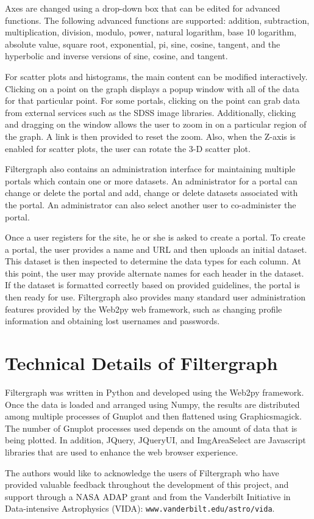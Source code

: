 Axes are changed using a drop-down box that can be edited for advanced functions. The following advanced functions are supported: addition, subtraction, multiplication, division, modulo, power, natural logarithm, base 10 logarithm, absolute value, square root, exponential, pi, sine, cosine, tangent, and the hyperbolic and inverse versions of sine, cosine, and tangent.

For scatter plots and histograms, the main content can be modified interactively. Clicking on a point on the graph displays a popup window with all of the data for that particular point. For some portals, clicking on the point can grab data from external services such as the SDSS image libraries. Additionally, clicking and dragging on the window allows the user to zoom in on a particular region of the graph. A link is then provided to reset the zoom. Also, when the Z-axis is enabled for scatter plots, the user can rotate the 3-D scatter plot.

Filtergraph also contains an administration interface for maintaining multiple portals which contain one or more datasets. An administrator for a portal can change or delete the portal and add, change or delete datasets associated with the portal. An administrator can also select another user to co-administer the portal.

Once a user registers for the site, he or she is asked to create a portal. To create a portal, the user provides a name and URL and then uploads an initial dataset. This dataset is then inspected to determine the data types for each column. At this point, the user may provide alternate names for each header in the dataset. If the dataset is formatted correctly based on provided guidelines, the portal is then ready for use. Filtergraph also provides many standard user administration features provided by the Web2py web framework, such as changing profile information and obtaining lost usernames and passwords.



\section{Technical Details of Filtergraph}
Filtergraph was written in Python and developed using the Web2py framework. Once the data is loaded and arranged using Numpy, the results are distributed among multiple processes of Gnuplot and then flattened using Graphicsmagick. The number of Gnuplot processes used depends on the amount of data that is being plotted. In addition, JQuery, JQueryUI, and ImgAreaSelect are Javascript libraries that are used to enhance the web browser experience. 

\acknowledgements 
The authors would like to acknowledge the users of Filtergraph who have provided valuable feedback throughout the development of this project, and support  through a NASA ADAP grant and from the Vanderbilt Initiative in Data-intensive Astrophysics (VIDA): {\tt www.vanderbilt.edu/astro/vida}. 
